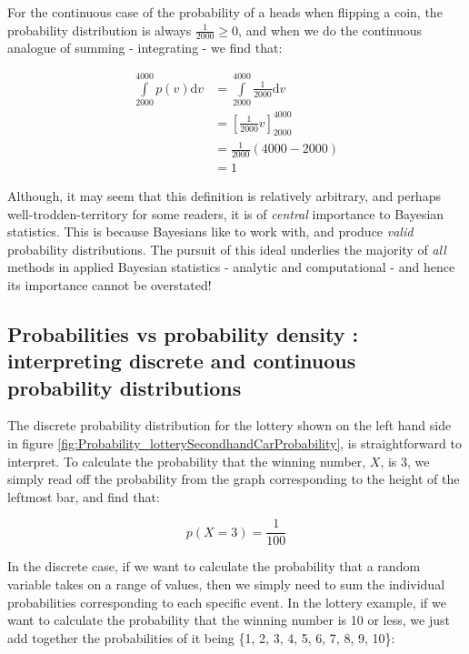 \documentclass[11pt,fullpage]{book}
\begin{document}
For the continuous case of the probability of a heads when flipping a coin, the probability distribution is always $\frac{1}{2000}\geq 0$, and when we do the continuous analogue of summing - integrating - we find that:

\begin{equation}
\begin{align}
\int\limits_{2000}^{4000} p(v) \mathrm{d}v &= \int\limits_{2000}^{4000} \frac{1}{2000} \mathrm{d}v\\
&= \left[\frac{1}{2000}v\right]^{4000}_{2000}\\
&= \frac{1}{2000}\left(4000-2000\right)\\
&= 1
\end{align}
\end{equation}

Although, it may seem that this definition is relatively arbitrary, and perhaps well-trodden-territory for some readers, it is of \textit{central} importance to Bayesian statistics. This is because Bayesians like to work with, and produce \textit{valid} probability distributions. The pursuit of this ideal underlies the majority of \textit{all} methods in applied Bayesian statistics - analytic and computational - and hence its importance cannot be overstated!

\subsection{Probabilities vs probability density : interpreting discrete and continuous probability distributions}\label{sec:Probability_densityVsMassFunctions}
The discrete probability distribution for the lottery shown on the left hand side in figure \ref{fig:Probability_lotterySecondhandCarProbability}, is straightforward to interpret. To calculate the probability that the winning number, $X$, is 3, we simply read off the probability from the graph corresponding to the height of the leftmost bar, and find that:

\begin{equation}
p(X=3)= \frac{1}{100}
\end{equation}

In the discrete case, if we want to calculate the probability that a random variable takes on a range of values, then we simply need to sum the individual probabilities corresponding to each specific event. In the lottery example, if we want to calculate the probability that the winning number is 10 or less, we just add together the probabilities of it being \{1, 2, 3, 4, 5, 6, 7, 8, 9, 10\}:
\end{document}
